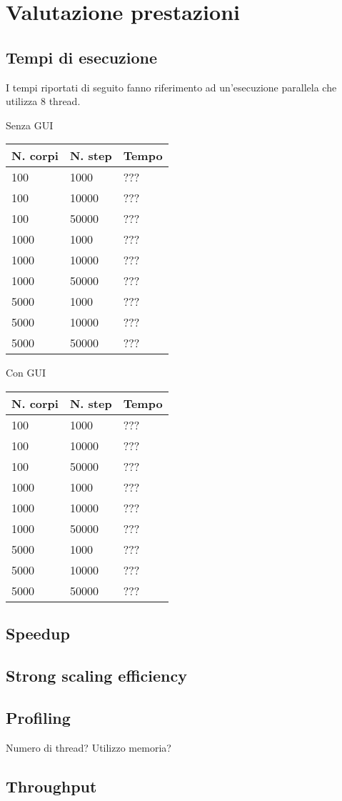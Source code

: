 \documentclass[12pt,a4paper,oneside,draft]{article}
\begin{document}
	\section{Valutazione prestazioni}
	\subsection{Tempi di esecuzione}
	I tempi riportati di seguito fanno riferimento ad un'esecuzione parallela che utilizza 8 thread.
	
	\hfill
	\begin{minipage}{.4\textwidth}
		Senza GUI
		
		\begin{tabular}{|l|l|l|}
			\hline
			\multicolumn{1}{|c|}{\textbf{N. corpi}} & \multicolumn{1}{c|}{\textbf{N. step}} & \multicolumn{1}{c|}{\textbf{Tempo}} \\ \hline
			100 & 1000 & ??? \\ \hline
			100 & 10000 & ??? \\ \hline
			100 & 50000 & ??? \\ \hline
			1000 & 1000 & ??? \\ \hline
			1000 & 10000 & ??? \\ \hline
			1000 & 50000 & ??? \\ \hline
			5000 & 1000 & ??? \\ \hline
			5000 & 10000 & ??? \\ \hline
			5000 & 50000 & ??? \\ \hline
		\end{tabular}
	\end{minipage}
	\hfill
	\begin{minipage}{.4\textwidth}
		Con GUI
		
		\begin{tabular}{|l|l|l|}
			\hline
			\multicolumn{1}{|c|}{\textbf{N. corpi}} & \multicolumn{1}{c|}{\textbf{N. step}} & \multicolumn{1}{c|}{\textbf{Tempo}} \\ \hline
			100 & 1000 & ??? \\ \hline
			100 & 10000 & ??? \\ \hline
			100 & 50000 & ??? \\ \hline
			1000 & 1000 & ??? \\ \hline
			1000 & 10000 & ??? \\ \hline
			1000 & 50000 & ??? \\ \hline
			5000 & 1000 & ??? \\ \hline
			5000 & 10000 & ??? \\ \hline
			5000 & 50000 & ??? \\ \hline
		\end{tabular}
	\end{minipage}
	\hfill

	\subsection{Speedup}
	\subsection{Strong scaling efficiency}
	\subsection{Profiling}
	Numero di thread?
	Utilizzo memoria?
	\subsection{Throughput}
\end{document}
